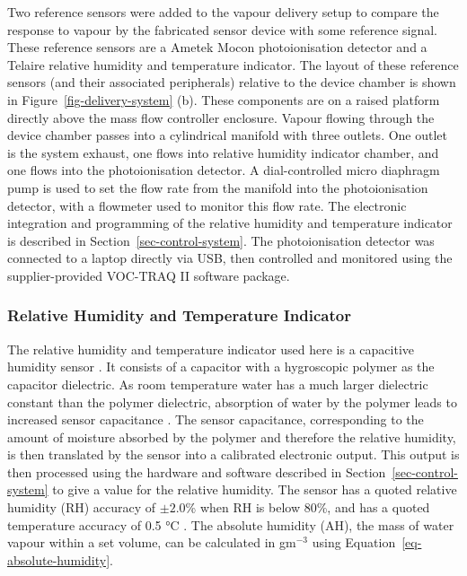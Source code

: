 \documentclass[
  a4paper,
]{scrbook}
\begin{document}
Two reference sensors were added to the vapour delivery setup to compare
the response to vapour by the fabricated sensor device with some
reference signal. These reference sensors are a Ametek Mocon
photoionisation detector and a Telaire relative humidity and temperature
indicator. The layout of these reference sensors (and their associated
peripherals) relative to the device chamber is shown in
Figure~\ref{fig-delivery-system} (b). These components are on a raised
platform directly above the mass flow controller enclosure. Vapour
flowing through the device chamber passes into a cylindrical manifold
with three outlets. One outlet is the system exhaust, one flows into
relative humidity indicator chamber, and one flows into the
photoionisation detector. A dial-controlled micro diaphragm pump is used
to set the flow rate from the manifold into the photoionisation
detector, with a flowmeter used to monitor this flow rate. The
electronic integration and programming of the relative humidity and
temperature indicator is described in Section~\ref{sec-control-system}.
The photoionisation detector was connected to a laptop directly via USB,
then controlled and monitored using the supplier-provided VOC-TRAQ II
software package.

\hypertarget{relative-humidity-and-temperature-indicator}{%
\subsubsection*{Relative Humidity and Temperature
Indicator}\label{relative-humidity-and-temperature-indicator}}

The relative humidity and temperature indicator used here is a
capacitive humidity sensor \autocite{Telairesensor}. It consists of a
capacitor with a hygroscopic polymer as the capacitor dielectric. As
room temperature water has a much larger dielectric constant than the
polymer dielectric, absorption of water by the polymer leads to
increased sensor capacitance \autocite{capacitivesensor}. The sensor
capacitance, corresponding to the amount of moisture absorbed by the
polymer and therefore the relative humidity, is then translated by the
sensor into a calibrated electronic output. This output is then
processed using the hardware and software described in
Section~\ref{sec-control-system} to give a value for the relative
humidity. The sensor has a quoted relative humidity (RH) accuracy of
\(\pm 2.0\)\% when RH is below 80\%, and has a quoted temperature
accuracy of 0.5 °C \autocite{Telairesensor}. The absolute humidity (AH),
the mass of water vapour within a set volume, can be calculated in
gm\(^{-3}\) using Equation~\ref{eq-absolute-humidity}.
\end{document}
